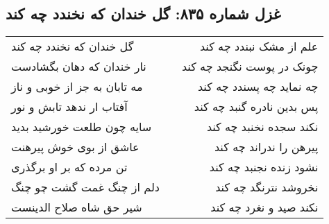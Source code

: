 \begin{center}
\section*{غزل شماره ۸۳۵: گل خندان که نخندد چه کند}
\label{sec:0835}
\begin{longtable}{l p{0.5cm} r}
گل خندان که نخندد چه کند
&&
علم از مشک نبندد چه کند
\\
نار خندان که دهان بگشادست
&&
چونک در پوست نگنجد چه کند
\\
مه تابان به جز از خوبی و ناز
&&
چه نماید چه پسندد چه کند
\\
آفتاب ار ندهد تابش و نور
&&
پس بدین نادره گنبد چه کند
\\
سایه چون طلعت خورشید بدید
&&
نکند سجده نخنبد چه کند
\\
عاشق از بوی خوش پیرهنت
&&
پیرهن را ندراند چه کند
\\
تن مرده که بر او برگذری
&&
نشود زنده نجنبد چه کند
\\
دلم از چنگ غمت گشت چو چنگ
&&
نخروشد نترنگد چه کند
\\
شیر حق شاه صلاح الدینست
&&
نکند صید و نغرد چه کند
\\
\end{longtable}
\end{center}
